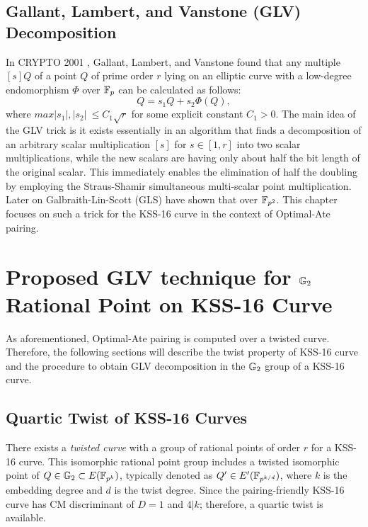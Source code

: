 \subsection{Gallant, Lambert, and Vanstone (GLV) Decomposition}
In CRYPTO 2001 \cite{C:GalLamVan01}, Gallant, Lambert, and Vanstone found that any multiple $[s]Q$ of a point $Q$ of prime order $r$ lying on an elliptic curve with a low-degree endomorphism $\Phi$ over $\mathbb{F}_p$ can be calculated as follows:
\begin{equation}
[s]Q = s_1 Q + s_2 \Phi(Q),  
\end{equation}
where $max{|s_1|,|s_2|}  ~\leq C_1 \sqrt{r}$ for some explicit constant $C_1 > 0$.
The main idea of the GLV trick is it exists essentially in an algorithm that finds a decomposition of an arbitrary scalar multiplication $[s]$ for $s \in  [1,r]$ into two scalar multiplications, while the new scalars are having only about half the bit length of the original scalar.
This immediately enables the elimination of half the doubling by employing the Straus-Shamir simultaneous multi-scalar point multiplication. 
Later on Galbraith-Lin-Scott (GLS) have shown that over $\mathbb{F}_{p^2}$. 
This chapter focuses on such a trick for the KSS-16 curve in the context of Optimal-Ate pairing. 

\section{Proposed GLV technique for \texorpdfstring{${\mathbb{G}}_{2}$}{} Rational Point on  KSS-16 Curve}
\label{Proposal}
As aforementioned, Optimal-Ate pairing is computed over a twisted curve. 
Therefore, the following sections will describe the twist property of KSS-16 curve and the procedure to obtain GLV decomposition in the ${\mathbb{G}}_{2}$ group of a KSS-16 curve.

\subsection{Quartic Twist of KSS-16 Curves} 
\label{eq:quartic_twist_candar18_kss16}
There exists a \textit{twisted curve} with a group of rational points of order $r$ for a KSS-16 curve. 
This isomorphic rational point group includes a twisted isomorphic point of $Q \in {\mathbb{G}}_{2} \subset E(\mathbb{F}_{p^k})$, typically denoted as $Q' \in E'(\mathbb{F}_{p^{k/d}})$, where $k$ is the embedding degree and $d$ is the twist degree.  
Since the pairing-friendly KSS-16 \cite{EPRINT:KacSchSco07} curve has CM discriminant of $D = 1$ and $4|k$; therefore, a quartic twist is available.


